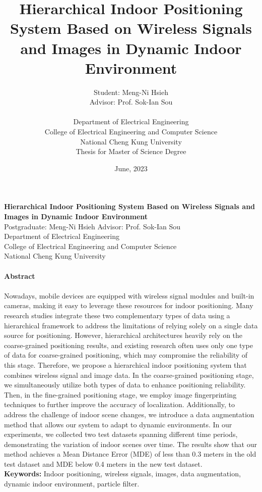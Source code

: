 \documentclass[a4paper,12pt]{report}
\title{Hierarchical Indoor Positioning System Based on Wireless Signals and Images in Dynamic Indoor Environment}
\author{Student: Meng-Ni Hsieh \\
Advisor: Prof. Sok-Ian Sou \\
\\
Department of Electrical Engineering  \\
College of Electrical Engineering and Computer Science \\
National Cheng Kung University \\
Thesis for Master of Science Degree \\
}
\date{June, 2023}
\begin{document}
\maketitle
\begin{titlepage}
    \begin{center}
        {\bf\large Hierarchical Indoor Positioning System Based on Wireless Signals and Images in Dynamic Indoor Environment}\\
        {Postgraduate: Meng-Ni Hsieh \hspace{8mm} Advisor: Prof. Sok-Ian Sou}\\
        {Department of Electrical Engineering}\\
        {College of Electrical Engineering and Computer Science}\\
        {National Cheng Kung University}\\
    \end{center}

    \paragraph{}
    \begin{center}
        {\bf Abstract}
    \end{center}
    \paragraph{}
    Nowadays, mobile devices are equipped with wireless signal modules and built-in cameras, making it easy to leverage these resources for indoor positioning. Many research studies integrate these two complementary types of data using a hierarchical framework to address the limitations of relying solely on a single data source for positioning. However, hierarchical architectures heavily rely on the coarse-grained positioning results, and existing research often uses only one type of data for coarse-grained positioning, which may compromise the reliability of this stage. Therefore, we propose a hierarchical indoor positioning system that combines wireless signal and image data. In the coarse-grained positioning stage, we simultaneously utilize both types of data to enhance positioning reliability. Then, in the fine-grained positioning stage, we employ image fingerprinting techniques to further improve the accuracy of localization. Additionally, to address the challenge of indoor scene changes, we introduce a data augmentation method that allows our system to adapt to dynamic environments. In our experiments, we collected two test datasets spanning different time periods, demonstrating the variation of indoor scenes over time. The results show that our method achieves a Mean Distance Error (MDE) of less than 0.3 meters in the old test dataset and MDE below 0.4 meters in the new test dataset.\\
    
    \textbf{Keywords:} {Indoor positioning, wireless signals, images, data augmentation, dynamic indoor environment, particle filter.}
\end{titlepage}
\end{document}

